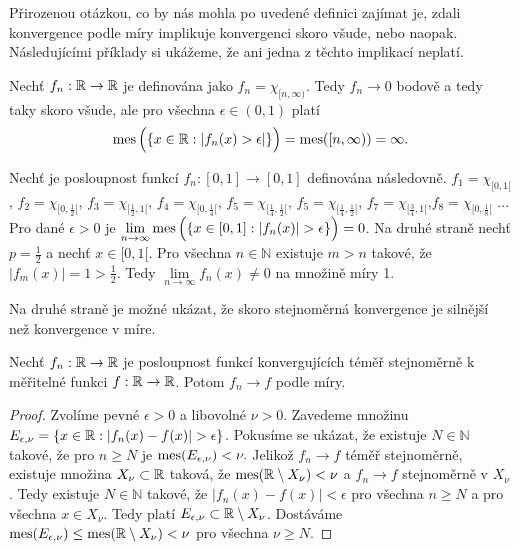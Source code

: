 Přirozenou otázkou, co by nás mohla po uvedené definici zajímat je, zdali konvergence podle míry implikuje konvergenci skoro všude, nebo naopak. 
Následujícími příklady si ukážeme, že ani jedna z těchto implikací neplatí. 


\begin{priklad}
\label{pr_1}
Nechť $f_n: \mathbb{R} \to \mathbb{R}$ je definována jako $f_n= \chi _{[n,\infty)}$. Tedy $f_n \to 0$ bodově a tedy taky skoro všude, ale pro všechna $\epsilon \in (0,1)$ platí
\begin{align*}
\operatorname{mes}\Big(\{x \in \mathbb{R}: |f_n(x) > \epsilon|\}\Big)=\operatorname{mes}([n,\infty))=\infty.
\end{align*}
\end{priklad} 

\begin{priklad}
\label{pr_2}
Nechť je posloupnost funkcí $f_n:[0,1] \to [0,1]$ definována následovně. $f_1=\chi_{[0,1[}$, $f_2=\chi_{[0,\frac{1}{2}[}$, $f_3=\chi_{[\frac{1}{2},1[}$, $f_4=\chi_{[0,\frac{1}{4}[}$, $f_5=\chi_{[\frac{1}{4},\frac{1}{2}[}$, $f_5=\chi_{[\frac{1}{4},\frac{1}{2}[}$, $f_7=\chi_{[\frac{3}{4},1[}$,$f_8=\chi_{[0,\frac{1}{8}[}$ ... Pro dané $\epsilon>0$ je $\lim \limits _{n \to \infty} \mes \Big(\{x \in [0,1]:|f_n(x)|> \epsilon\}\Big)=0$. Na druhé straně nechť $p=\frac{1}{2}$ a nechť $x \in [0,1[$. Pro všechna $n \in \mathbb{N}$ existuje $m>n$ takové, že $|f_m(x)|=1 >\frac{1}{2}$. Tedy $\lim \limits _{n \to \infty} f_n(x) \neq 0$ na množině míry 1.
\end{priklad}

Na druhé straně je možné ukázat, že skoro stejnoměrná konvergence je silnější než konvergence v míre. 

\begin{theorem}
Nechť $f_n:\mathbb{R} \to \mathbb{R}$ je posloupnost funkcí konvergujících téměř stejnoměrně k měřitelné funkci $f:\mathbb{R} \to \mathbb{R}$. Potom $f_n \to f$ podle míry.
\end{theorem}
\begin{proof}
Zvolíme pevné $\epsilon>0$ a libovolné $\nu>0$. Zavedeme množinu $E_{\epsilon, \nu}=\{x \in \R: |f_n(x)-f(x)|>\epsilon\}$. Pokusíme se ukázat, že existuje $N \in \mathbb{N}$ takové, že pro $n \geq N$ je $\operatorname{mes}(E_{\epsilon, \nu})<\nu.$
Jelikož $f_n \to f$ téměř stejnoměrně, existuje množina $X_{\nu} \subset \mathbb{R}$ taková, že $\operatorname{mes}(\mathbb{R} \setminus X_{\nu}) < \nu$ a $f_n \to f$ stejnoměrně v $X_{\nu}$. Tedy existuje $N \in \mathbb{N}$ takové, že $|f_n(x)-f(x)|< \epsilon$ pro všechna $n \geq N$ a pro všechna $x \in X_{\nu}$. Tedy platí $E_{\epsilon, \nu} \subset \mathbb{R} \setminus X_{\nu}$. Dostáváme $\operatorname{mes}(E_{\epsilon, \nu})\leq \operatorname{mes}(\mathbb{R} \setminus X_{\nu}) < \nu$ pro všechna $\nu \geq N$.
\end{proof}


